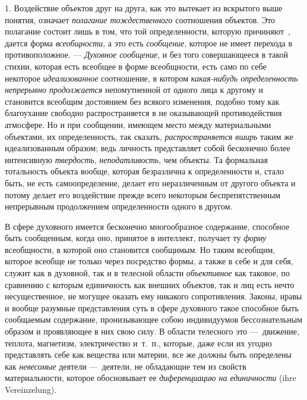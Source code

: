 \documentclass[twoside]{article}
\begin{document}
{{{{{{1. Воздействие объектов друг на друга, как это вытекает из
вскрытого выше понятия, означает
{\em полагание тождественного}
соотношения объектов. Это полагание состоит лишь в том, что
той определенности, которую
причиняют~\label{bkm:bm68},
дается форма
{\em всеобщности}, а это
есть {\em сообщение},
которое не имеет перехода в противоположное. —
{\em Духовное сообщение},
и без того совершающееся в такой стихии, которая есть
всеобщее в форме всеобщности, есть само по себе некоторое
{\em идеализованное}
соотношение, в котором
{\em какая-нибудь определенность
непрерывно продолжается} непомутненной от одного лица к
другому и становится всеобщим достоянием без всякого изменения, подобно
тому как благоухание свободно распространяется в не оказывающей
противодействия атмосфере. Но и при сообщении, имеющем место между
материальными объектами, их определенность, так сказать,
{\em распространяется вширь}
таким же идеализованным образом; ведь личность представляет
собой бесконечно более интенсивную
{\em твердость},{\em 
неподатливость}, чем объекты. Та формальная
тотальность объекта вообще, которая безразлична к определенности и, стало
быть, не есть самоопределение, делает его неразличенным от другого объекта
и потому делает его воздействие прежде всего некоторым беспрепятственным
непрерывным продолжением определенности одного в другом.

В сфере духовного имеется бесконечно многообразное содержание,
способное быть сообщенным, когда оно, принятое в интеллект, получает ту
{\em форму} всеобщности,
в которой оно становится сообщимым. Но таким всеобщим, которое всеобще не
только через посредство формы, а также в себе и для себя, служит как в
духовной, так и в телесной области
{\em объективное} как
таковое, по сравнению с которым единичность как внешних объектов, так и лиц
есть нечто несущественное, не могущее оказать ему никакого сопротивления.
Законы, нравы и вообще разумные представления суть в сфере духовного такое
способное быть сообщаемым содержание, пронизывающее собою индивидуумов
бессознательным образом и проявляющее в них свою силу. В области телесного
это —~движение, теплота, магнетизм, электричество и~т.~п.,
которые, даже если их угодно представлять себе как вещества или материи,
все же должны быть определены как
{\em невесомые} деятели
—~деятели, не обладающие тем из свойств материальности,
которое обосновывает ее
{\em диференциацию на единичности} (ihre Vereinzelung).

}}}}}}
\end{document}
